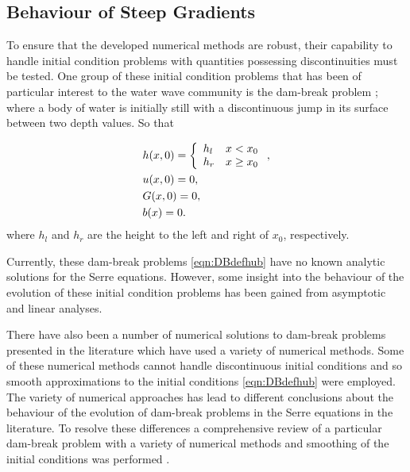 \subsection{Behaviour of Steep Gradients}
To ensure that the developed numerical methods are robust, their capability to handle initial condition problems with quantities possessing discontinuities must be tested. One group of these initial condition problems that has been of particular interest to the water wave community is the dam-break problem \cite{El-etal-2006,Hank-etal-2010-2034,Mitsotakis-etal-2014,Mitsotakis-etal-2017,doCarmo-etal-2018-404}; where a body of water is initially still with a discontinuous jump in its surface between two depth values. So that

\begin{subequations}
	\begin{align}
	&h(x,0) =\left\lbrace \begin{array}{l r}
	h_l & x < x_0 \\
	h_r & x \ge x_0
	\end{array} \right., \\
	&u(x,0) = 0 , \\
	&G(x,0) = 0 , \\
	&b(x) = 0.
	\end{align}
	\label{eqn:DBdefhub}
\end{subequations} 
where $h_l$ and $h_r$ are the height to the left and right of $x_0$, respectively. 

Currently, these dam-break problems \eqref{eqn:DBdefhub} have no known analytic solutions for the Serre equations. However, some insight into the behaviour of the evolution of these initial condition problems has been gained from asymptotic \cite{El-etal-2006} and linear \cite{Dougalis-etal-2007} analyses. 

There have also been a number of numerical solutions to dam-break problems presented in the literature \cite{El-etal-2006,Hank-etal-2010-2034,Mitsotakis-etal-2014,Mitsotakis-etal-2017,doCarmo-etal-2018-404} which have used a variety of numerical methods. Some of these numerical methods cannot handle discontinuous initial conditions \cite{El-etal-2006,Mitsotakis-etal-2014,Mitsotakis-etal-2017,doCarmo-etal-2018-404} and so smooth approximations to the initial conditions \eqref{eqn:DBdefhub} were employed. The variety of numerical approaches has lead to different conclusions about the behaviour of the evolution of dam-break problems in the Serre equations in the literature. To resolve these differences a comprehensive review of a particular dam-break problem with a variety of numerical methods and smoothing of the initial conditions was performed \cite{Pitt-2018-61}. 

